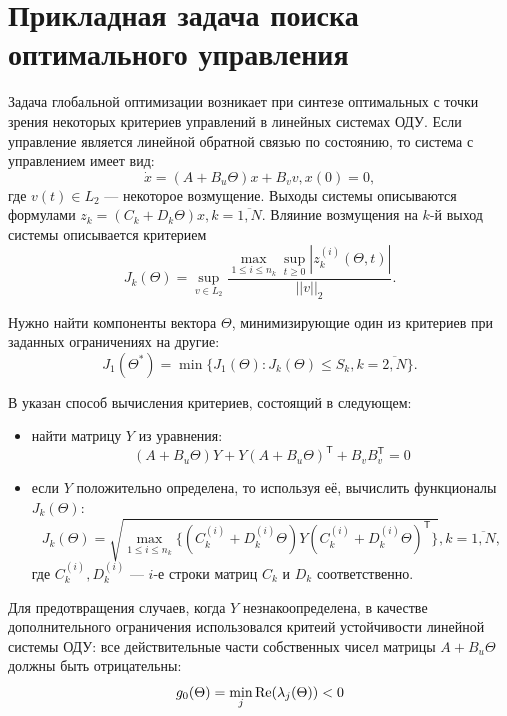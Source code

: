 \section{Прикладная задача поиска оптимального управления}
\label{sec:optimal_cpntrol}
Задача глобальной оптимизации возникает при синтезе оптимальных с точки зрения некоторых
критериев управлений в линейных системах ОДУ. Если управление является линейной обратной
связью по состоянию, то система с управлением имеет вид:
\begin{equation}
  \label{eq:control_system}
    \dot x = (A+B_u\Theta)x + B_v v, x(0)=0,
\end{equation}
где  \(v(t)\in L_2\) --- некоторое возмущение.
Выходы системы описываются формулами \(z_k=(C_k+D_k\Theta)x,k=\overline{1,N}\).
Вляиние возмущения на \(k\)-й выход системы описывается критерием
\begin{displaymath}
  J_k(\Theta)=\sup_{v\in L_2} \frac{\max_{1\le i \le n_k} \sup_{t\ge 0}|z_k^{(i)}(\Theta,t)|}{||v||_2}.
\end{displaymath}

Нужно найти компоненты вектора \(\Theta\), минимизирующие один из критериев при
заданных ограничениях на другие:
\begin{displaymath}
   J_1(\Theta^*)=\min\{J_1(\Theta):J_k(\Theta)\leqslant S_k,k=\overline{2,N}\}.
\end{displaymath}

В \cite{optControl} указан способ вычисления критериев, состоящий в следующем:
\begin{itemize}
\item найти матрицу \(Y\) из уравнения:
\begin{displaymath}
  (A+B_u\Theta)Y+Y(A+B_u\Theta)^\mathsf{T}+B_v B_v^\mathsf{T} = 0
\end{displaymath}
\item если \(Y\) положительно определена, то используя её, вычислить функционалы \(J_k(\Theta)\):
\begin{displaymath}
  J_k(\Theta)=\sqrt{\max_{1\leqslant i\leqslant n_k}\{(C_k^{(i)}+D_k^{(i)}\Theta)Y(C_k^{(i)}+D_k^{(i)}\Theta)^\mathsf{T}\}},k=\overline{1,N},
\end{displaymath}
где \(C_k^{(i)},D_k^{(i)}\) --- \(i\)-е строки матриц \(C_k\) и \(D_k\) соответственно.
\end{itemize}

Для предотвращения случаев, когда \(Y\) незнакоопределена, в качестве дополнительного ограничения
использовался критеий устойчивости линейной системы ОДУ: все действительные части
собственных чисел матрицы \(A+B_u\Theta\) должны быть отрицательны:
\begin{displaymath}
  g_0(\Theta)=\min_{j}\operatorname{\operatorname{Re}}(\lambda_j(\Theta)) < 0
\end{displaymath}


